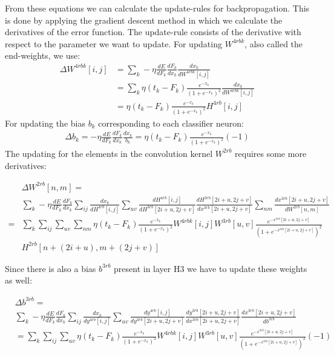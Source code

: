 \documentclass[a4paper,onecolumn]{report}
\begin{document}
From these equations we can calculate the update-rules for backpropagation. This is done by applying the gradient descent method in which we calculate the derivatives of the error function. The update-rule consists of the derivative with respect to the parameter we want to update. For updating $W^{4rbk}$, also called the end-weights, we use:
\begin{equation}
\begin{split}
\Delta W^{4rbk}[i,j]&= \sum_{k} - \eta \frac{dE}{d F_{k}} \frac{dF_{k}}{dx_{k}} \frac{dx_{k}}{dW^{4rbk}[i,j]} \\
&= \sum_{k} \eta (t_{k}-F_{k})\frac{e^{-x_{k}}}{(1+e^{-x_{k}})^{2}} \frac{dx_{k}}{dW^{4rbk}[i,j]} \\
&= \eta (t_{k}-F_{k})\frac{e^{-x_{k}}}{(1+e^{-x_{k}})^{2}} H^{4rb}[i,j]
\end{split}
\end{equation}
For updating the bias $b_{k}$ corresponding to each classifier neuron:
\begin{equation}
\begin{split}
\Delta b_{k}= - \eta \frac{dE}{d F_{k}} \frac{dF_{k}}{dx_{k}} \frac{dx_{k}}{b_{k}}=\eta (t_{k}-F_{k})\frac{e^{-x_{k}}}{(1+e^{-x_{k}})^{2}} (-1)
\end{split}
\end{equation}
The updating for the elements in the convolution kernel $ W^{2rb}$ requires some more derivatives:
\begin{small}
\begin{equation}
\begin{split}
	&\Delta W^{2rb}[n,m] = \\
	&\sum_{k} - \eta  \frac{dE}{dF_{k}} 
	\frac{dF_{k}}{dx_{k}} 
	\sum_{ij} \frac{dx_{k}}{dH^{4rb}[i,j]} 
	\sum_{uv}\frac{dH^{4rb}[i,j]}{d H^{3rb} [2i+u,2j+v]} 
	\frac{d H^{3rb} [2i+u,2j+v]}{d x^{3rb}[2i+u,2j+v]}
	\sum_{nm}\frac{d x^{3rb}[2i+u,2j+v]}{d W^{2rb}[n,m]} \\
	=&\sum_{k} \sum_{ij} \sum_{uv} \sum_{nm}  \eta (t_{k}-F_{k})\frac{e^{-x_{k}}}{(1+e^{-x_{k}})^{2}} W^{4rbk}[i,j]  W^{3rb}[u,v] \frac{e^{-x^{3rb}[2i+u,2j+v]}}{(1+e^{-x^{3rb}[2i+u,2j+v]})^2} \\
	 & H^{2rb} [n+(2i+u),m+(2j+v)]
\end{split}
\end{equation}
\end{small}
Since there is also a bias $b^{3rb}$ present in layer H3 we have to update these weights as well:
\begin{small}
\begin{equation}
\begin{split}
	&\Delta b^{3rb} =\\
	&\sum_{k} - \eta  \frac{dE}{dF_{k}} 
	\frac{dF_{k}}{dx_{k}} 
	\sum_{ij} \frac{dx_{k}}{dy^{4rb}[i,j]} 
	\sum_{uv}\frac{dy^{4rb}[i,j]}{d y^{3rb} [2i+u,2j+v]} 
	\frac{d y^{3rb} [2i+u,2j+v]}{d x^{3rb}[2i+u,2j+v]}
	\frac{d x^{3rb}[2i+u,2j+v]}{d b^{3rb}} \\
	&=\sum_{k} \sum_{ij} \sum_{uv} \eta (t_{k}-F_{k})\frac{e^{-x_{k}}}{(1+e^{-x_{k}})^{2}} W^{4rbk}[i,j]  W^{3rb}[u,v] \frac{e^{-x^{3rb}[2i+u,2j+v]}}{(1+e^{-x^{3rb}[2i+u,2j+v]})^2} (-1)
\end{split}
\end{equation}
\end{small}
\end{document}
